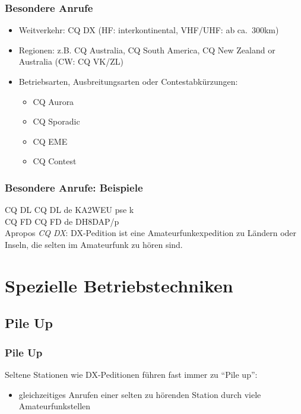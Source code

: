 \begin{frame}
  \frametitle{Besondere Anrufe}

  \begin{itemize}
    \item Weitverkehr: CQ DX (HF: interkontinental, VHF/UHF: ab ca.~300km)
    \item Regionen: z.B. CQ Australia, CQ South America, CQ New Zealand or
      Australia (CW: CQ VK/ZL)
    \item Betriebsarten, Ausbreitungsarten oder Contestabkürzungen:
      \begin{itemize}
        \item CQ Aurora
        \item CQ Sporadic
        \item CQ EME
        \item CQ Contest
      \end{itemize}
  \end{itemize}
\end{frame}

\begin{frame}
  \frametitle{Besondere Anrufe: Beispiele}

  CQ DL CQ DL de KA2WEU pse k \\[2em]

  CQ FD CQ FD de DH8DAP/p \\[2em]

  Apropos \emph{CQ DX}: DX-Pedition ist eine Amateurfunkexpedition zu Ländern
  oder Inseln, die selten im Amateurfunk zu hören sind.

\end{frame}

\section{Spezielle Betriebstechniken}

\subsection{Pile Up}


\begin{frame}
  \frametitle{Pile Up}

  Seltene Stationen wie DX-Peditionen führen fast
  immer zu ``Pile up'':

  \begin{itemize}
    \item gleichzeitiges Anrufen einer selten zu hörenden Station durch
      viele Amateurfunkstellen
  \end{itemize}
\end{frame}

